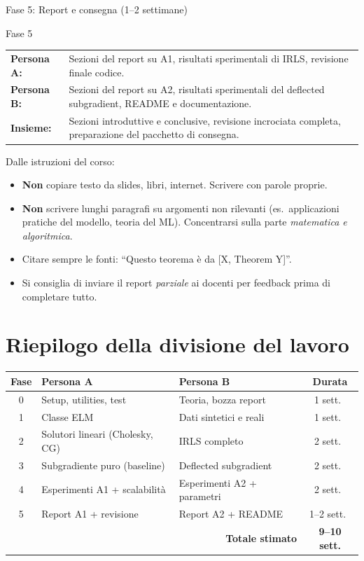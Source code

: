 \documentclass[a4paper,11pt]{article}
\begin{document}
\begin{phasebox}{Fase 5: Report e consegna (1--2 settimane)}
\begin{splitbox}{Fase 5}
\begin{tabularx}{\textwidth}{lX}
\textbf{Persona A:} & Sezioni del report su A1, risultati sperimentali di IRLS, revisione finale codice. \\
\textbf{Persona B:} & Sezioni del report su A2, risultati sperimentali del deflected subgradient, README e documentazione. \\
\textbf{Insieme:} & Sezioni introduttive e conclusive, revisione incrociata completa, preparazione del pacchetto di consegna.
\end{tabularx}
\end{splitbox}

\begin{warnbox}
Dalle istruzioni del corso:
\begin{itemize}[nosep]
  \item \textbf{Non} copiare testo da slides, libri, internet. Scrivere con parole proprie.
  \item \textbf{Non} scrivere lunghi paragrafi su argomenti non rilevanti (es.\ applicazioni pratiche del modello, teoria del ML). Concentrarsi sulla parte \emph{matematica e algoritmica}.
  \item Citare sempre le fonti: ``Questo teorema è da [X, Theorem Y]''.
  \item Si consiglia di inviare il report \emph{parziale} ai docenti per feedback prima di completare tutto.
\end{itemize}
\end{warnbox}
\end{phasebox}

\section{Riepilogo della divisione del lavoro}
\label{sec:summary_split}

\begin{center}
\renewcommand{\arraystretch}{1.3}
\begin{tabularx}{\textwidth}{|c|X|X|c|}
\hline
\textbf{Fase} & \textbf{Persona A} & \textbf{Persona B} & \textbf{Durata} \\
\hline\hline
0 & Setup, utilities, test & Teoria, bozza report & 1 sett.\ \\
\hline
1 & Classe ELM & Dati sintetici e reali & 1 sett.\ \\
\hline
2 & Solutori lineari (Cholesky, CG) & IRLS completo & 2 sett.\ \\
\hline
3 & Subgradiente puro (baseline) & Deflected subgradient & 2 sett.\ \\
\hline
4 & Esperimenti A1 + scalabilità & Esperimenti A2 + parametri & 2 sett.\ \\
\hline
5 & Report A1 + revisione & Report A2 + README & 1--2 sett.\ \\
\hline
\multicolumn{3}{|r|}{\textbf{Totale stimato}} & \textbf{9--10 sett.} \\
\hline
\end{tabularx}
\end{center}
\end{document}
